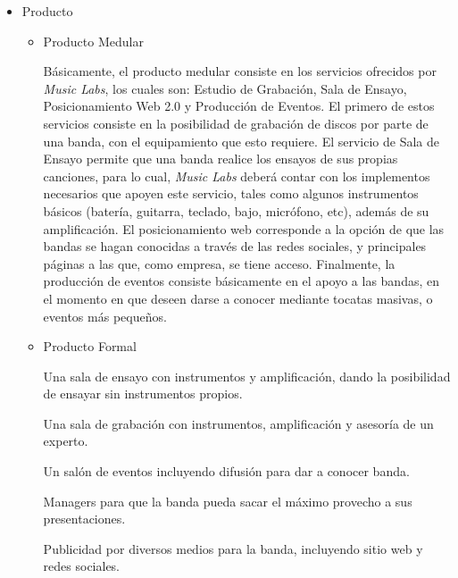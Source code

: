 \begin{itemize}

\item{Producto}


\begin{itemize}
\item Producto Medular

Básicamente, el producto medular consiste en los servicios ofrecidos por \emph{Music Labs}, 
los cuales son: Estudio de Grabación, Sala de Ensayo, Posicionamiento Web 2.0 y Producción de Eventos. 
El primero de estos servicios consiste en la posibilidad de grabación de discos por parte de una
banda, con el equipamiento que esto requiere. El servicio de Sala de Ensayo permite que una banda 
realice los ensayos de sus propias canciones, para lo cual, \emph{Music Labs} deberá contar con los 
implementos necesarios que apoyen este servicio, tales como algunos instrumentos básicos (batería, guitarra, 
teclado, bajo, micrófono, etc), además de su amplificación. El posicionamiento web corresponde a la 
opción de que las bandas se hagan conocidas a través de las redes sociales, y principales páginas a las 
que, como empresa, se tiene acceso. Finalmente, la producción de eventos consiste básicamente en el apoyo
a las bandas, en el momento en que deseen darse a conocer mediante tocatas masivas, o eventos más pequeños.

\item Producto Formal

	Una sala de ensayo con instrumentos y amplificación, dando la posibilidad de ensayar sin instrumentos propios.

	Una sala de grabación con instrumentos, amplificación y asesoría de un experto.

	Un salón de eventos incluyendo difusión para dar a conocer banda.

	Managers para que la banda pueda sacar el máximo provecho a sus presentaciones.

	Publicidad por diversos medios para la banda, incluyendo sitio web y redes sociales.


\end{itemize}
\end{itemize}
